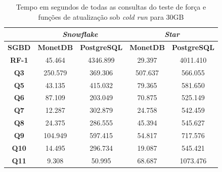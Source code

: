 \begin{table}[t]
        \centering
        \caption{Tempo em segundos de todas as consultas do teste de força e funções de atualização sob \textit{cold run} para 30GB}
        \label{tab:queries_cold_30}
        \begin{tabular}{|c|c|c|c|c|} 
                \cline{2-5}
                \multicolumn{1}{c|}{} & \multicolumn{2}{c|}{\textit{\textbf{Snowflake}} } & \multicolumn{2}{c|}{\textit{\textbf{Star}} }  \\ 
                \hline
                 \textbf{SGBD}        & \textbf{MonetDB}  & \textbf{PostgreSQL}           & \textbf{MonetDB}  & \textbf{PostgreSQL}       \\ 
                \hline
                 \textbf{RF-1}        & 45.464            & 4346.899                      & 29.397            & 4011.410                  \\ 
                \hline
                 \textbf{Q3}          & 250.579           & 369.306                       & 507.637           & 566.055                   \\ 
                \hline
                 \textbf{Q5}          & 43.135            & 415.032                       & 79.365            & 581.650                   \\ 
                \hline
                 \textbf{Q6}          & 87.109            & 203.049                       & 70.875            & 525.149                   \\ 
                \hline
                 \textbf{Q7}          & 12.287            & 302.879                       & 24.758            & 542.459                   \\ 
                \hline
                 \textbf{Q8}          & 24.375            & 286.555                       & 45.394            & 545.627                   \\ 
                \hline
                 \textbf{Q9}          & 104.949           & 597.415                       & 54.817            & 717.576                   \\ 
                \hline
                 \textbf{Q10}         & 14.495            & 296.734                       & 19.087            & 545.421                   \\ 
                \hline
                 \textbf{Q11}         & 9.308             & 50.995                        & 68.687            & 1073.476                  \\ 
                \hline

\end{tabular}
\end{table}
